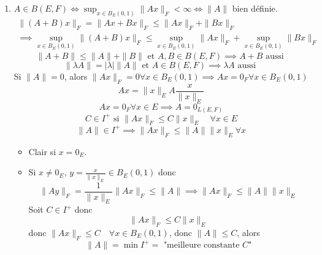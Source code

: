 \begin{preuve}
   \begin{enumerate}
       \item $A \in B(E, F) \iff \sup_{x \in B_{E}(0, 1)} \|Ax\|_{F} < \infty \iff \|A\|$ bien définie.  
           \begin{align*}
               \|(A + B)x\|_F = \|Ax + Bx\|_F \le \|Ax\|_F + \|Bx\|_F\\ \implies \sup_{x \in B_E(0, 1)} \|(A + B)x\|_F \le \sup_{x \in B_E(0, 1)} \|Ax\|_F + \sup_{x \in B_E(0, 1)} \|Bx\|_F
           \end{align*}
           \[
               \|A + B\| \le \|A\| + \|B\| \text{ et } A, B \in B(E, F) \implies A + B \text{ aussi }
           \] 
           \[
           \|\lambda A\| = |\lambda|\|A\| \text{ et } A \in B(E, F) \implies \lambda A \text{ aussi }
           \] 
           Si $\|A\| = 0$, alors  $\|Ax\|_F = 0 \forall x \in B_E(0, 1) \implies Ax = 0_F \forall x \in B_E(0, 1)$
           \[
           Ax = \|x\|_E A \frac{x}{\|x\|_E}
           \] 
           \[
           Ax = 0_F \forall x \in E \implies A = 0_{L(E, F)}
           \] 
           \[
           C \in I^+ \text{ si } \|Ax\|_F \le C\|x\|_E \quad \forall x \in E
           \] 
           \[
           \|A\| \in I^+ \implies \|Ax\|_F \le \|A\|\|x\|_E \forall x
           \] 
           \begin{itemize}
               \item Clair si $x = 0_E$. 
               \item Si  $x \neq 0_E$, $y = \frac{x}{\|x\|_E} \in B_E(0, 1)$ donc 
                   \[
                       \|Ay\|_F = \frac{1}{\|x\|_E}\|Ax\|_F \le \|A\| \implies \|Ax\|_F \le \|A\|\|x\|_E
                   \] 
                   Soit $C \in I^+$ donc  
                   \[
                   \|Ax\|_F \le C\|x\|_E
                   \] 
                   donc $\|Ax\|_F \le C \quad \forall x \in B_E(0,1)$, donc $\|A\| \le C$, alors 
                   \[
                       \|A\| = \min I^+ = \text{ "meilleure constante $C$"}
                   \] 
           \end{itemize}
   \end{enumerate} 
\end{preuve}
